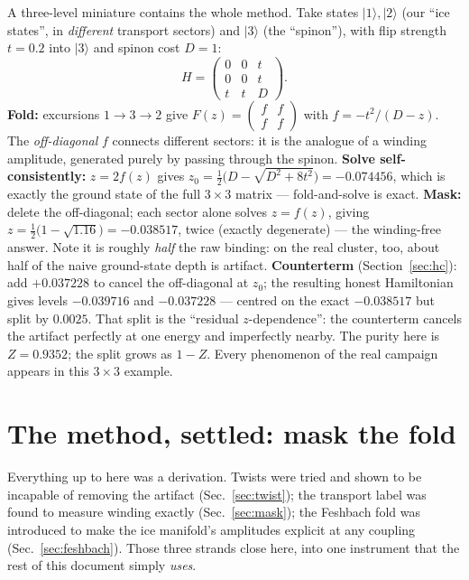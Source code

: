 \documentclass[11pt,a4paper]{article}
\begin{document}
\begin{worked}
A three-level miniature contains the whole method.  Take states
$|1\rangle,|2\rangle$ (our ``ice states'', in \emph{different} transport
sectors) and $|3\rangle$ (the ``spinon''), with flip strength $t=0.2$ into
$|3\rangle$ and spinon cost $D=1$:
\[
H=\begin{pmatrix}0&0&t\\ 0&0&t\\ t&t&D\end{pmatrix}.
\]
\textbf{Fold:} excursions $1\to3\to2$ give
$F(z)=\begin{pmatrix}f&f\\ f&f\end{pmatrix}$ with $f=-t^2/(D-z)$.
The \emph{off-diagonal} $f$ connects different sectors: it is the analogue of
a winding amplitude, generated purely by passing through the spinon.
\textbf{Solve self-consistently:} $z=2f(z)$ gives
$z_0=\tfrac12\bigl(D-\sqrt{D^2+8t^2}\bigr)=-0.074456$, which is exactly the
ground state of the full $3\times3$ matrix --- fold-and-solve is exact.
\textbf{Mask:} delete the off-diagonal; each sector alone solves
$z=f(z)$, giving $z=\tfrac12\bigl(1-\sqrt{1.16}\bigr)=-0.038517$, twice
(exactly degenerate) --- the winding-free answer.  Note it is roughly
\emph{half} the raw binding: on the real cluster, too, about half of the
naive ground-state depth is artifact.
\textbf{Counterterm} (Section~\ref{sec:hc}): add $+0.037228$ to cancel the
off-diagonal at $z_0$; the resulting honest Hamiltonian gives levels
$-0.039716$ and $-0.037228$ --- centred on the exact $-0.038517$ but split
by $0.0025$.  That split is the ``residual $z$-dependence'': the counterterm
cancels the artifact perfectly at one energy and imperfectly nearby.  The
purity here is $Z=0.9352$; the split grows as $1-Z$.  Every phenomenon of
the real campaign appears in this $3\times3$ example.
\end{worked}

\section{The method, settled: mask the fold}
\label{sec:method}

Everything up to here was a derivation.  Twists were tried and shown to be
incapable of removing the artifact (Sec.~\ref{sec:twist}); the transport
label was found to measure winding exactly (Sec.~\ref{sec:mask}); the
Feshbach fold was introduced to make the ice manifold's amplitudes explicit
at any coupling (Sec.~\ref{sec:feshbach}).  Those three strands close here,
into one instrument that the rest of this document simply \emph{uses}.
\end{document}
